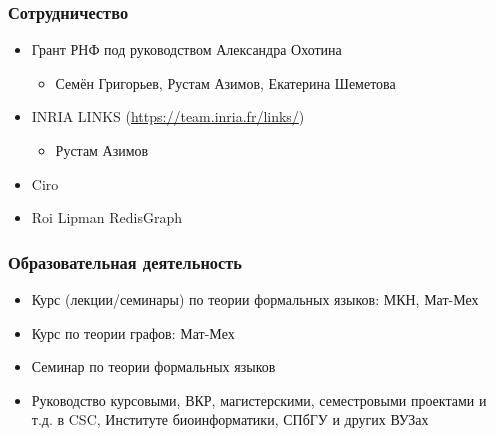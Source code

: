 \documentclass[xcolor=table]{beamer}
\begin{document}
\begin{frame}[fragile]

  \frametitle{Сотрудничество}
\begin{itemize}
      \item Грант РНФ под руководством Александра Охотина
      \begin{itemize}
        \item Семён Григорьев, Рустам Азимов, Екатерина Шеметова
      \end{itemize}
      \item INRIA LINKS (\url{https://team.inria.fr/links/})
      \begin{itemize}
         \item Рустам Азимов         
      \end{itemize}
      \item Ciro
      \item Roi Lipman RedisGraph

\end{itemize}
\end{frame}

\begin{frame}[fragile]

  \frametitle{Образовательная деятельность}
\begin{itemize}
      \item Курс (лекции/семинары) по теории формальных языков: МКН, Мат-Мех
      \item Курс по теории графов: Мат-Мех
      \item Семинар по теории формальных языков
      \item Руководство курсовыми, ВКР, магистерскими, семестровыми проектами и т.д. в CSC, Институте биоинформатики, СПбГУ и других ВУЗах
\end{itemize}
\end{frame}
\end{document}
